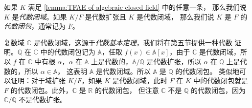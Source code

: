\begin{definition}
  如果 $K$ 满足 \autoref{lemma:TFAE of algebraic closed field} 中的任意一条，
  那么我们说 $K$ 是\emph{代数闭域}。如果 $K/F$ 是代数扩张且 $K$ 是代数闭域，
  那么我们说 $K$ 是 $F$ 的\emph{代数闭包}，通常记为 $\bar F$。
\end{definition}

\begin{example}\label{exa:ag closure of Q}
  复数域 $\mathbb{C}$ 是代数闭域，这源于\emph{代数基本定理}，我们将在第五节提供一种代数
  证明。$\mathbb{Q}$ 在 $\mathbb{C}$ 中的代数闭包记为 $\mathbb{A}$，任取 
  $f(x)\in \mathbb{A}[x]$，由于 $\mathbb{C}$ 是代数闭域，所以 $f$ 在 $\mathbb{C}$
  中有根 $\alpha$，$\alpha$ 在 $\mathbb{A}$ 上是代数的，$\mathbb{A}/\mathbb{Q}$
  是代数扩张，所以 $\alpha$ 在 $\mathbb{Q}$ 上是代数的，所以 $\alpha\in\mathbb{A}$，
  这表明 $\mathbb{A}$ 是代数闭域。所以 $\mathbb{A}$ 是 $\mathbb{Q}$ 的代数闭包。
  类似地可以证明：对于域扩张 $K/F$，如果 $K$ 是代数闭域，此时
  $F$ 在 $K$ 中的代数闭包就是 $F$ 的代数闭包。此外，$\mathbb{C}$ 是 $\mathbb{R}$ 的代数闭包，
  但注意 $\mathbb{C}$ 不是 $\mathbb{Q}$
  的代数闭包，因为 $\mathbb{C}/\mathbb{Q}$ 不是代数扩张。
\end{example}

